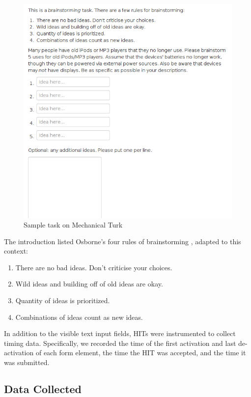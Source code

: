 \begin{figure}[h!]
    \centering
    \includegraphics[width=0.9\columnwidth]{sample_task}
    \caption{Sample task on Mechanical Turk}
    \label{fig:sample_task}
\end{figure}

The introduction listed Osborne's four rules of brainstorming \cite{osborn_applied_1957}, adapted to this context:

\begin{enumerate}
\item There are no bad ideas. Don't criticise your choices.
\item Wild ideas and building off of old ideas are okay.
\item Quantity of ideas is prioritized.
\item Combinations of ideas count as new ideas.
\end{enumerate}

In addition to the visible text input fields, HITs were instrumented to collect timing data. Specifically, we recorded the time of the first activation and last de-activation of each form element, the time the HIT was accepted, and the time it was submitted.

\subsection{Data Collected}

